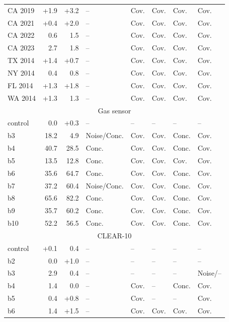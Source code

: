 \documentclass[pdflatex,sn-basic]{sn-jnl}
\begin{document}
\begin{table}[!htbp]
\begin{tabular}{@{}lrrlllll@{}}
CA 2019 & +1.9 & +3.2 & -- & Cov. & Cov. & Cov. & Cov. \\
CA 2021 & +0.4 & +2.0 & -- & Cov. & Cov. & Cov. & Cov. \\
CA 2022 & \textminus{}0.6 & \textminus{}1.5 & -- & Cov. & Cov. & Cov. & Cov. \\
CA 2023 & \textminus{}2.7 & \textminus{}1.8 & -- & Cov. & Cov. & Cov. & Cov. \\
TX 2014 & +1.4 & +0.7 & -- & Cov. & Cov. & Cov. & Cov. \\
NY 2014 & \textminus{}0.4 & \textminus{}0.8 & -- & Cov. & Cov. & Cov. & Cov. \\
FL 2014 & +1.3 & +1.8 & -- & Cov. & Cov. & Cov. & Cov. \\
WA 2014 & +1.3 & \textminus{}1.3 & -- & Cov. & Cov. & Cov. & Cov. \\
\midrule
\multicolumn{8}{c}{Gas sensor} \\
control & 0.0 & +0.3 & -- & -- & -- & -- & -- \\
b3 & \textminus{}18.2 & \textminus{}4.9 & Noise/Conc. & Cov. & Cov. & Conc. & Cov. \\
b4 & \textminus{}40.7 & \textminus{}28.5 & Conc. & Cov. & Cov. & Conc. & Cov. \\
b5 & \textminus{}13.5 & \textminus{}12.8 & Conc. & Cov. & Cov. & Cov. & Cov. \\
b6 & \textminus{}35.6 & \textminus{}64.7 & Conc. & Cov. & Cov. & Conc. & Cov. \\
b7 & \textminus{}37.2 & \textminus{}60.4 & Noise/Conc. & Cov. & Cov. & Conc. & Cov. \\
b8 & \textminus{}65.6 & \textminus{}82.2 & Conc. & Cov. & Cov. & Conc. & Cov. \\
b9 & \textminus{}35.7 & \textminus{}60.2 & Conc. & Cov. & Cov. & Conc. & Cov. \\
b10 & \textminus{}52.2 & \textminus{}56.5 & Conc. & Cov. & Cov. & Conc. & Cov. \\
\midrule
\multicolumn{8}{c}{CLEAR-10} \\
control & +0.1 & \textminus{}0.4 & -- & -- & -- & -- & -- \\
b2 & 0.0 & +1.0 & -- & -- & -- & -- & -- \\
b3 & \textminus{}2.9 & \textminus{}0.4 & -- & -- & -- & -- & Noise/-- \\
b4 & \textminus{}1.4 & 0.0 & -- & Cov. & -- & Conc. & Cov. \\
b5 & \textminus{}0.4 & +0.8 & -- & Cov. & -- & -- & Cov. \\
b6 & \textminus{}1.4 & +1.5 & -- & Cov. & Cov. & Cov. & Cov. \\

\end{tabular}
\end{table}
\end{document}
